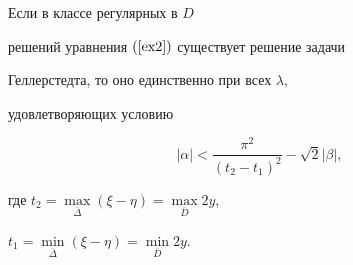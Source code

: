 \begin{thm}


Если в классе регулярных в $D$


решений уравнения $(\ref{ex2})$ существует решение задачи


Геллерстедта, то оно единственно при всех $\lambda$,


удовлетворяющих условию


\begin{equation}\label{uslov}


|\alpha|<\frac{\pi^2}{(t_2-t_1)^2}-\sqrt{2}|\beta|,


\end{equation}


где $t_2=\max \limits_{\overline \Delta}(\xi-\eta)=\max


\limits_{\overline D}2y$,


$t_1=\min\limits_{\overline \Delta}(\xi-\eta)=\min \limits_{\overline D}2y$.


\end{thm}





